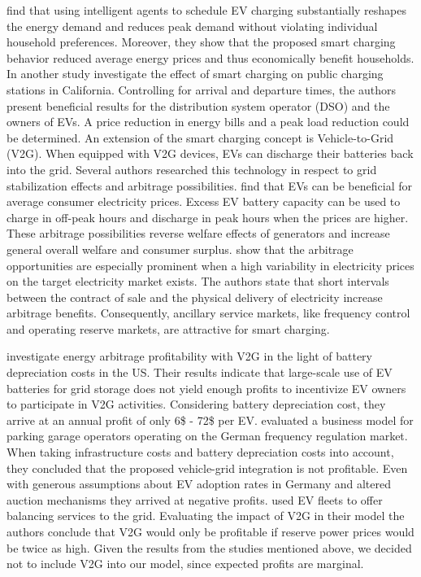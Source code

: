 \documentclass[12pt, article]{article}
\begin{document}
\textcite{valogianni14_effec_manag_elect_vehic_storag} find that using intelligent
agents to schedule EV charging substantially reshapes the energy demand and
reduces peak demand without violating individual household preferences. Moreover,
they show that the proposed smart charging behavior reduced average energy
prices and thus economically benefit households. In another study
\textcite{kara15_estim_benef_elect_vehic_smart} investigate the effect of smart
charging on public charging stations in California. Controlling for
arrival and departure times, the authors present beneficial results for the
distribution system operator (DSO) and the owners of EVs. A price
reduction in energy bills and a peak load reduction could be determined.
An extension of the smart charging concept is Vehicle-to-Grid (V2G). When
equipped with V2G devices, EVs can discharge their batteries back into the grid.
Several authors researched this technology in respect to grid stabilization
effects and arbitrage possibilities.
\textcite{schill11_elect_vehic_imper_elect_market} find that EVs can be beneficial
for average consumer electricity prices. Excess EV battery capacity can be used
to charge in off-peak hours and discharge in peak hours when the prices are
higher. These arbitrage possibilities reverse welfare effects of generators
and increase general overall welfare and consumer surplus.
\textcite{tomic07_using_fleet_elect_drive_vehic_grid_suppor} show that the
arbitrage opportunities are especially prominent when a high variability in
electricity prices on the target electricity market exists. The authors state
that short intervals between the contract of sale and the physical delivery of
electricity increase arbitrage benefits. Consequently, ancillary service markets,
like frequency control and operating reserve markets, are attractive for smart
charging.

\textcite{peterson10_econom_using_plug_in_hybrid} investigate energy arbitrage
profitability with V2G in the light of battery depreciation costs in the US.
Their results indicate that large-scale use of EV batteries for grid storage
does not yield enough profits to incentivize EV owners to participate in V2G
activities. Considering battery depreciation cost, they arrive at an annual
profit of only 6\$ - 72\$ per EV.
\textcite{brandt17_evaluat_busin_model_vehic_grid_integ} evaluated a business
model for parking garage operators operating on the German frequency regulation
market. When taking infrastructure costs and battery depreciation costs into
account, they concluded that the proposed vehicle-grid integration is not
profitable. Even with generous assumptions about EV adoption rates in Germany
and altered auction mechanisms they arrived at negative profits.
\textcite{kahlen17_fleet} used EV fleets to offer balancing services to the grid.
Evaluating the impact of V2G in their model the authors conclude that V2G would
only be profitable if reserve power prices would be twice as high. Given the
results from the studies mentioned above, we decided not to include V2G into our
model, since expected profits are marginal.
\end{document}
